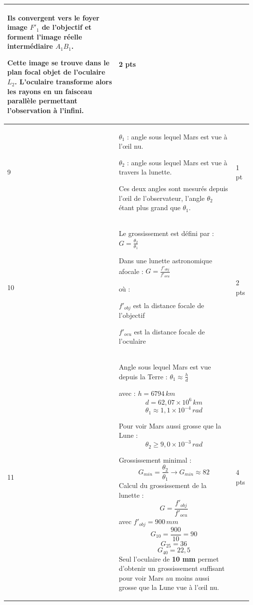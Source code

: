 \documentclass[a4paper,11pt,fleqn]{scrartcl}%
\begin{document}
\begin{center}
\begin{longtable}{||p{.1\linewidth}|p{.78\linewidth}|p{.07\linewidth}|}
Ils convergent vers le foyer image $F'_1$ de l'objectif et forment l'image réelle intermédiaire $A_1B_1$.  

Cette image se trouve dans le plan focal objet de l'oculaire $L_2$.
L'oculaire transforme alors les rayons en un faisceau parallèle permettant l'observation à l'infini.
& 2 pts \\

\hline

9 &
$\theta_1$ : angle sous lequel Mars est vue à l'œil nu.  

$\theta_2$ : angle sous lequel Mars est vue à travers la lunette.  

Ces deux angles sont mesurés depuis l'œil de l'observateur, l'angle $\theta_2$ étant plus grand que $\theta_1$.

& 1 pt \\

\hline

10 &
Le grossissement est défini par :
$G=\frac{\theta_2}{\theta_1}$

Dans une lunette astronomique afocale : $G=\frac{f'_{obj}}{f'_{ocu}}$

où :
\begin{itemize*}
\item $f'_{obj}$ est la distance focale de l'objectif
\item $f'_{ocu}$ est la distance focale de l'oculaire
\end{itemize*}

& 2 pts \\

\hline

11 &
Angle sous lequel Mars est vue depuis la Terre : $
\theta_1 \approx \frac{h}{d}$

avec : $
h=6794\,km$
\[
d=62,07\times10^6\,km
\]
\[
\theta_1 \approx 1,1\times10^{-4}\,rad
\]

Pour voir Mars aussi grosse que la Lune :
\[
\theta_2 \ge 9,0\times10^{-3}\,rad
\]

Grossissement minimal :
$$G_{min}=\frac{\theta_2}{\theta_1} \rightarrow G_{min}\approx 82$$
Calcul du grossissement de la lunette :
\[
G=\frac{f'_{obj}}{f'_{ocu}}
\]
avec $f'_{obj}=900\,mm$
\[
G_{10}=\frac{900}{10}=90
\]
\[
G_{25}=36
\]
\[
G_{40}=22,5
\]
Seul l’oculaire de \textbf{10 mm} permet d’obtenir un grossissement suffisant pour voir Mars au moins aussi grosse que la Lune vue à l’œil nu.
& 4 pts \\
\hline

\end{longtable}
\end{center}
\end{document}
